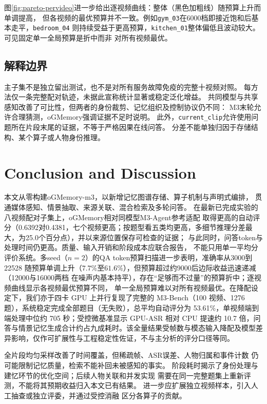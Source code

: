 \documentclass[UTF8,a4paper,11pt,fontset=fandol]{ctexart}
\DeclareRobustCommand{\code}[1]{\nolinkurl{#1}}
\newcommand*{\memoryprojectname}{oGMemory}
\newcommand*{\memoryprojectnamemthree}{\memoryprojectname-m3}
\begin{document}
图\ref{fig:pareto-pervideo}进一步给出逐视频曲线：整体（黑色加粗线）随预算上升而单调提高，
但各视频的最优预算并不一致。例如\code{gym_03}在6000档即接近饱和后基本走平，\code{bedroom_04}
则持续受益于更高预算，\code{kitchen_01}整体偏低且波动较大。可见固定单一全局预算是折中而非
对所有视频最优。

\subsection{解释边界}
主子集不是独立留出测试，也不是对所有服务故障免疫的完整十视频对照。
每方法仅一条完整配对轨迹，未据此宣称统计显著或稳定泛化增益。
共同模型与共享感知改善了可比性，但两者的身份裁剪、记忆组织及控制协议仍不同：
M3末轮允许合理猜测，\memoryprojectname{}强调证据不足时说明。
此外，\code{current_clip}允许使用问题所在片段末尾的证据，不等于严格因果在线问答。
分差不能单独归因于存储结构、某个算子或人物身份推理。

\section{Conclusion and Discussion}
本文从零构建\memoryprojectnamemthree{}，以新增记忆图谱存储、算子机制与声明式编排，
贯通媒体感知、情景抽取、来源关联、混合检索及多轮问答。
在最新已完成实验的八视频配对子集上，\memoryprojectname{}相对同模型M3-Agent参考适配
取得更高的自动评分（0.6392对0.4381，七个视频更高；按题型看五类均更高，多细节推理分差最大，为25.0个百分点），并以来源位置保存可检查的证据；
与此同时，问答token与处理时间仍更高。质量、输入开销和阶段成本应联合报告，
不能只用单一平均分评价系统。多seed（$n=2$）的QA token预算扫描进一步表明，准确率从3000到22528
随预算单调上升（$7.7\%$至$61.6\%$），但预算超过约9000后边际收益迅速递减（12000与16000两档
在噪声内基本持平），存在“足够而不过量”的预算折中；逐视频曲线显示各视频最优预算不同，
单一全局预算难以对所有视频最优。在降配设定下，我们亦于四卡 GPU 上并行复现了完整的 M3-Bench（100 视频、1276 题），系统稳定完成全部题目（无失败），总平均自动评分为 53.61\%，单视频端到端处理中位约 705 秒；受控微基准显示 GPU-ASR 相对 CPU 提速约 10.7 倍，问答与情景记忆生成合计约占九成耗时。该全量结果受帧数与模态输入降配及模型差异影响，仅作可扩展性与工程稳定性佐证，不与主分析的评分口径等同。

全片段均匀采样改善了时间覆盖，但稀疏帧、ASR误差、人物归属和事件计数
仍可能限制记忆质量，检索不能补回未被感知的事实。
阶段耗时揭示了身份处理与建忆环节的优化空间；后续人物关联和并发实现
需要在同一完整题集上重新评测，不能将其预期收益归入本文已有结果。
进一步应扩展独立视频样本，引入人工抽查或独立评委，并通过受控消融
区分各算子的贡献。
\end{document}
